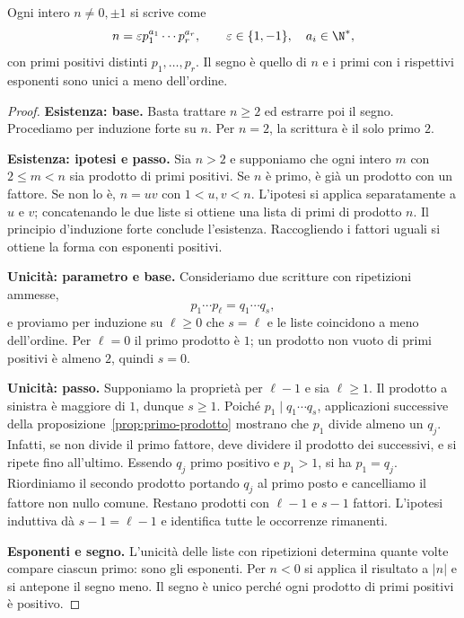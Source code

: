 \begin{teorema}\label{teo:fattorizzazione}
Ogni intero $n\ne0,\pm1$ si scrive come
\[
n=\varepsilon p_1^{a_1}\cdots p_r^{a_r},\qquad
\varepsilon\in\{1,-1\},\quad a_i\in\N^*,
\]
con primi positivi distinti $p_1,\ldots,p_r$. Il segno è quello di $n$ e i primi con i rispettivi esponenti sono unici a meno dell'ordine.
\end{teorema}
\begin{proof}
\textbf{Esistenza: base.} Basta trattare $n\ge2$ ed estrarre poi il segno. Procediamo per induzione forte su $n$. Per $n=2$, la scrittura è il solo primo $2$.

\textbf{Esistenza: ipotesi e passo.} Sia $n>2$ e supponiamo che ogni intero $m$ con $2\le m<n$ sia prodotto di primi positivi. Se $n$ è primo, è già un prodotto con un fattore. Se non lo è, $n=uv$ con $1<u,v<n$. L'ipotesi si applica separatamente a $u$ e $v$; concatenando le due liste si ottiene una lista di primi di prodotto $n$. Il principio d'induzione forte conclude l'esistenza. Raccogliendo i fattori uguali si ottiene la forma con esponenti positivi.

\textbf{Unicità: parametro e base.} Consideriamo due scritture con ripetizioni ammesse,
\[
p_1\cdots p_\ell=q_1\cdots q_s,
\]
e proviamo per induzione su $\ell\ge0$ che $s=\ell$ e le liste coincidono a meno dell'ordine. Per $\ell=0$ il primo prodotto è $1$; un prodotto non vuoto di primi positivi è almeno $2$, quindi $s=0$.

\textbf{Unicità: passo.} Supponiamo la proprietà per $\ell-1$ e sia $\ell\ge1$. Il prodotto a sinistra è maggiore di $1$, dunque $s\ge1$. Poiché $p_1\mid q_1\cdots q_s$, applicazioni successive della proposizione~\ref{prop:primo-prodotto} mostrano che $p_1$ divide almeno un $q_j$. Infatti, se non divide il primo fattore, deve dividere il prodotto dei successivi, e si ripete fino all'ultimo. Essendo $q_j$ primo positivo e $p_1>1$, si ha $p_1=q_j$. Riordiniamo il secondo prodotto portando $q_j$ al primo posto e cancelliamo il fattore non nullo comune. Restano prodotti con $\ell-1$ e $s-1$ fattori. L'ipotesi induttiva dà $s-1=\ell-1$ e identifica tutte le occorrenze rimanenti.

\textbf{Esponenti e segno.} L'unicità delle liste con ripetizioni determina quante volte compare ciascun primo: sono gli esponenti. Per $n<0$ si applica il risultato a $|n|$ e si antepone il segno meno. Il segno è unico perché ogni prodotto di primi positivi è positivo.
\end{proof}


